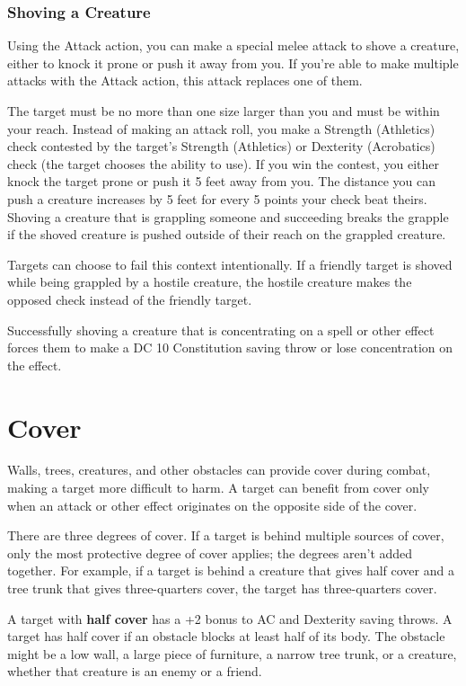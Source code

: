 \subsubsection{Shoving a Creature}

Using the Attack action, you can make a special melee attack to shove a creature, either to knock it prone or push it away from you. If you're able to make multiple attacks with the Attack action, this attack replaces one of them.

The target must be no more than one size larger than you and must be within your reach. Instead of making an attack roll, you make a Strength (Athletics) check contested by the target's Strength (Athletics) or Dexterity (Acrobatics) check (the target chooses the ability to use). If you win the contest, you either knock the target prone or push it 5 feet away from you. The distance you can push a creature increases by 5 feet for every 5 points your check beat theirs. Shoving a creature that is grappling someone and succeeding breaks the grapple if the shoved creature is pushed outside of their reach on the grappled creature.

Targets can choose to fail this context intentionally. If a friendly target is shoved while being grappled by a hostile creature, the hostile creature makes the opposed check instead of the friendly target.

Successfully shoving a creature that is concentrating on a spell or other effect forces them to make a DC 10 Constitution saving throw or lose concentration on the effect.

\section{Cover}

Walls, trees, creatures, and other obstacles can provide cover during combat, making a target more difficult to harm. A target can benefit from cover only when an attack or other effect originates on the opposite side of the cover.

There are three degrees of cover. If a target is behind multiple sources of cover, only the most protective degree of cover applies; the degrees aren't added together. For example, if a target is behind a creature that gives half cover and a tree trunk that gives three-quarters cover, the target has three-quarters cover.

A target with \textbf{half cover} has a +2 bonus to AC and Dexterity saving throws. A target has half cover if an obstacle blocks at least half of its body. The obstacle might be a low wall, a large piece of furniture, a narrow tree trunk, or a creature, whether that creature is an enemy or a friend.

